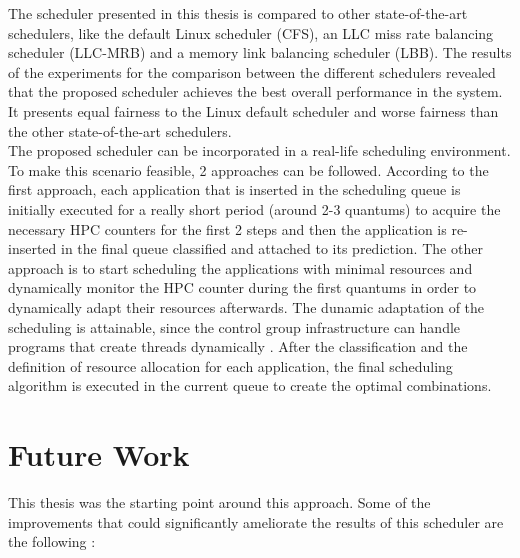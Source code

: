 \documentclass[diploma]{Styles/softlab-thesis}
\begin{document}
The scheduler presented in this thesis is compared to other state-of-the-art schedulers, like the default Linux scheduler (CFS), an LLC miss rate balancing scheduler (LLC-MRB) and a memory link balancing scheduler (LBB). The results of the experiments for the comparison between the different schedulers revealed that the proposed scheduler achieves the best overall performance in the system. It presents equal fairness to the Linux default scheduler and worse fairness than the other state-of-the-art schedulers. \\

The proposed scheduler can be incorporated in a real-life scheduling environment. To make this scenario feasible, 2 approaches can be followed. According to the first approach, each application that is inserted in the scheduling queue is initially executed for a really short period (around 2-3 quantums) to acquire the necessary HPC counters for the first 2 steps and then the application is re-inserted in the final queue classified and attached to its prediction. The other approach is to start scheduling the applications with minimal resources and dynamically monitor the HPC counter during the first quantums in order to dynamically adapt their resources afterwards. The dunamic adaptation of the scheduling is attainable, since the control group infrastructure can handle programs that create threads dynamically \cite{reference10}. After the classification and the definition of resource allocation for each application, the final scheduling algorithm is executed in the current queue to create the optimal combinations.\\

\section{Future Work}

This thesis was the starting point around this approach. Some of the improvements that could significantly ameliorate the results of this scheduler are the following :
\end{document}
